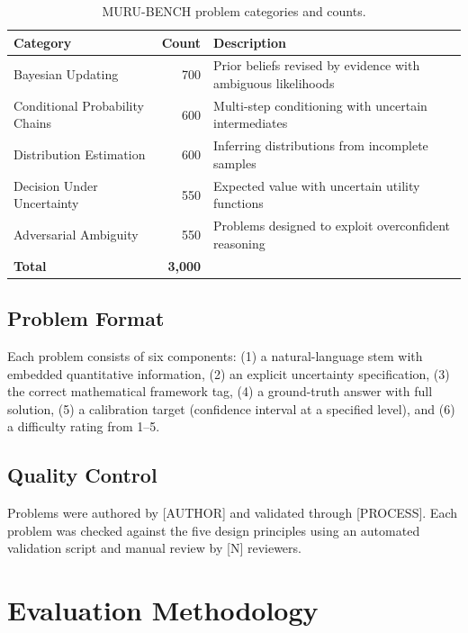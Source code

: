 \documentclass{article}
\begin{document}
\begin{table}[h]
\centering
\caption{MURU-BENCH problem categories and counts.}
\label{tab:categories}
\begin{tabular}{lrp{6cm}}
\toprule
\textbf{Category} & \textbf{Count} & \textbf{Description} \\
\midrule
Bayesian Updating & 700 & Prior beliefs revised by evidence with ambiguous likelihoods \\
Conditional Probability Chains & 600 & Multi-step conditioning with uncertain intermediates \\
Distribution Estimation & 600 & Inferring distributions from incomplete samples \\
Decision Under Uncertainty & 550 & Expected value with uncertain utility functions \\
Adversarial Ambiguity & 550 & Problems designed to exploit overconfident reasoning \\
\midrule
\textbf{Total} & \textbf{3{,}000} & \\
\bottomrule
\end{tabular}
\end{table}

\subsection{Problem Format}

Each problem consists of six components: (1) a natural-language stem with embedded quantitative information, (2) an explicit uncertainty specification, (3) the correct mathematical framework tag, (4) a ground-truth answer with full solution, (5) a calibration target (confidence interval at a specified level), and (6) a difficulty rating from 1--5.

\subsection{Quality Control}

Problems were authored by [AUTHOR] and validated through [PROCESS]. Each problem was checked against the five design principles using an automated validation script and manual review by [N] reviewers.


\section{Evaluation Methodology}
\label{sec:evaluation}
\end{document}
